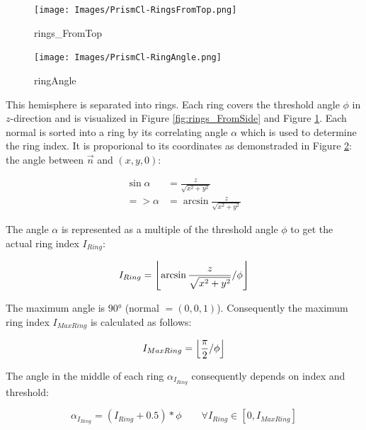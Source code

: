 \documentclass[../ClassicThesis.tex]{subfiles}
\begin{document}
\begin{figure}
    \texttt{[image: Images/PrismCl-RingsFromTop.png]}
    \caption{rings_FromTop}
    \label{fig:rings_FromTop}
\end{figure}

\begin{figure}
    \texttt{[image: Images/PrismCl-RingAngle.png]}
    \caption{ringAngle}
    \label{fig:ringAngle}
\end{figure}


This hemisphere is separated into rings. Each ring covers the threshold angle $\phi$ in $z$-direction and is visualized in Figure \ref{fig:rings_FromSide} and Figure \ref{fig:rings_FromTop}. Each normal is sorted into a ring by its correlating angle $\alpha$ which is used to determine the ring index. It is proporional to its coordinates as demonstraded in Figure \ref{fig:ringAngle}: the angle between $\vec{n}$ and $(x,y,0)$:

\begin{equation*}
\begin{split}
    \sin{\alpha} & = \frac{z}{ \sqrt{x^{2} + y^{2}} } \\
    => \alpha  & = \arcsin{ \frac{z}{ \sqrt{x^{2} + y^{2}} } }
\end{split}
\end{equation*}


The angle $\alpha$ is represented as a multiple of the threshold angle $\phi$ to get the actual ring index $I_{Ring}$:

\begin{equation*}
    I_{Ring} = \floor*{ 
                    \arcsin{ 
                        \frac{z}{ \sqrt{ x^{2} + y^{2} } } 
                    } 
                    / \phi 
                }
\end{equation*}

The maximum angle is 90° (normal $ = (0,0,1)$). Consequently the maximum ring index $I_{MaxRing}$ is calculated as follows:

\begin{equation*}
    I_{MaxRing} = \floor*{
                    \frac{\pi}{2}
                    / \phi
                  }
\end{equation*}



The angle in the middle of each ring ${\alpha}_{I_{Ring}}$ consequently depends on index and threshold:

\begin{equation}
\label{equ:AlphaIRing}
    {\alpha}_{I_{Ring}} = (I_{Ring} + 0.5) * \phi \qquad \forall{ I_{Ring} \in [0, I_{MaxRing}] }
\end{equation}
\end{document}
